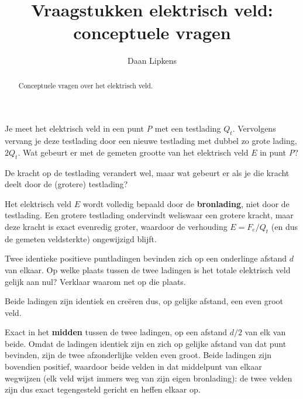 \documentclass{ximera}
\title{Vraagstukken elektrisch veld: conceptuele vragen}
\author{Daan Lipkens}
\begin{document}
\begin{abstract}
    Conceptuele vragen over het elektrisch veld.
\end{abstract}
\maketitle

\begin{question}
    Je meet het elektrisch veld in een punt \textit{P} met een testlading $Q_t$. Vervolgens vervang je deze testlading door een nieuwe testlading met dubbel zo grote lading, $2Q_t$. Wat gebeurt er met de gemeten grootte van het elektrisch veld $E$ in punt \textit{P}?

    \begin{multipleChoice}
    \end{multipleChoice}

    \begin{hint}
        De kracht op de testlading verandert wel, maar wat gebeurt er als je die kracht deelt door de (grotere) testlading?
    \end{hint}

    \begin{solution}\nl
        Het elektrisch veld $E$ wordt volledig bepaald door de \textbf{bronlading}, niet door de testlading. Een grotere testlading ondervindt weliswaar een grotere kracht, maar deze kracht is exact evenredig groter, waardoor de verhouding $E = F_e/Q_t$ (en dus de gemeten veldsterkte) ongewijzigd blijft.
    \end{solution}
\end{question}

\begin{question}
    Twee identieke positieve puntladingen bevinden zich op een onderlinge afstand $d$ van elkaar. Op welke plaats tussen de twee ladingen is het totale elektrisch veld gelijk aan nul? Verklaar waarom net op die plaats.

    \begin{hint}
        Beide ladingen zijn identiek en creëren dus, op gelijke afstand, een even groot veld.
    \end{hint}

    \begin{solution}\nl
        Exact in het \textbf{midden} tussen de twee ladingen, op een afstand $d/2$ van elk van beide. Omdat de ladingen identiek zijn en zich op gelijke afstand van dat punt bevinden, zijn de twee afzonderlijke velden even groot. Beide ladingen zijn bovendien positief, waardoor beide velden in dat middelpunt van elkaar wegwijzen (elk veld wijst immers weg van zijn eigen bronlading): de twee velden zijn dus exact tegengesteld gericht en heffen elkaar op.
    \end{solution}
\end{question}
\end{document}
